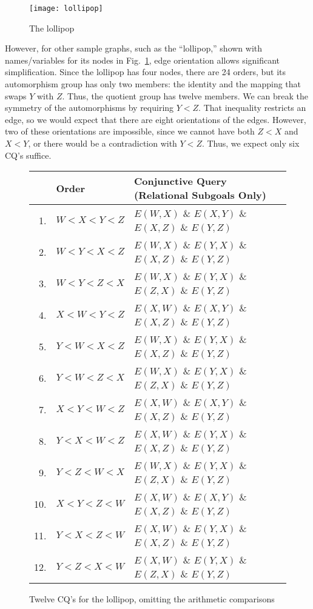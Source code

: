 \begin{figure}[htfb]
\centerline{\texttt{[image: lollipop]}}
\caption{The lollipop}
\label{lol-fig}
\end{figure}

However, for other sample graphs, such as the ``lollipop,'' shown with names/variables for its nodes in Fig.~\ref{lol-fig}, edge orientation allows significant simplification.
Since the lollipop has four nodes, there are 24 orders, but its automorphism group has only two members: the identity and the mapping that swaps $Y$ with $Z$.  Thus, the quotient group has twelve members.  We can break the symmetry of the automorphisms by requiring $Y<Z$.  That inequality restricts an edge, so we would expect that there are eight orientations of the edges.  However, two of these orientations are impossible, since we cannot have both $Z<X$ and $X<Y$, or there would be a contradiction with $Y<Z$.  Thus, we expect only six CQ's suffice.

\begin{figure}[htfb]
{\begin{center}
\begin{tabular}{r l l}
 & Order & Conjunctive Query (Relational Subgoals Only)\\
\hline
1. & $W<X<Y<Z$ & $E(W,X)$ \& $E(X,Y)$ \& $E(X,Z)$ \& $E(Y,Z)$\\
2. & $W<Y<X<Z$ & $E(W,X)$ \& $E(Y,X)$ \& $E(X,Z)$ \& $E(Y,Z)$\\
3. & $W<Y<Z<X$ & $E(W,X)$ \& $E(Y,X)$ \& $E(Z,X)$ \& $E(Y,Z)$\\
4. & $X<W<Y<Z$ & $E(X,W)$ \& $E(X,Y)$ \& $E(X,Z)$ \& $E(Y,Z)$\\
5. & $Y<W<X<Z$ & $E(W,X)$ \& $E(Y,X)$ \& $E(X,Z)$ \& $E(Y,Z)$\\
6. & $Y<W<Z<X$ & $E(W,X)$ \& $E(Y,X)$ \& $E(Z,X)$ \& $E(Y,Z)$\\
7. & $X<Y<W<Z$ & $E(X,W)$ \& $E(X,Y)$ \& $E(X,Z)$ \& $E(Y,Z)$\\
8. & $Y<X<W<Z$ & $E(X,W)$ \& $E(Y,X)$ \& $E(X,Z)$ \& $E(Y,Z)$\\
9. & $Y<Z<W<X$ & $E(W,X)$ \& $E(Y,X)$ \& $E(Z,X)$ \& $E(Y,Z)$\\
10. & $X<Y<Z<W$ & $E(X,W)$ \& $E(X,Y)$ \& $E(X,Z)$ \& $E(Y,Z)$\\
11. & $Y<X<Z<W$ & $E(X,W)$ \& $E(Y,X)$ \& $E(X,Z)$ \& $E(Y,Z)$\\
12. & $Y<Z<X<W$ & $E(X,W)$ \& $E(Y,X)$ \& $E(Z,X)$ \& $E(Y,Z)$\\
\end{tabular}
\end{center}
}
\caption{Twelve CQ's for the lollipop, omitting the arithmetic comparisons}
\label{lol-cqs-fig}

\end{figure}

